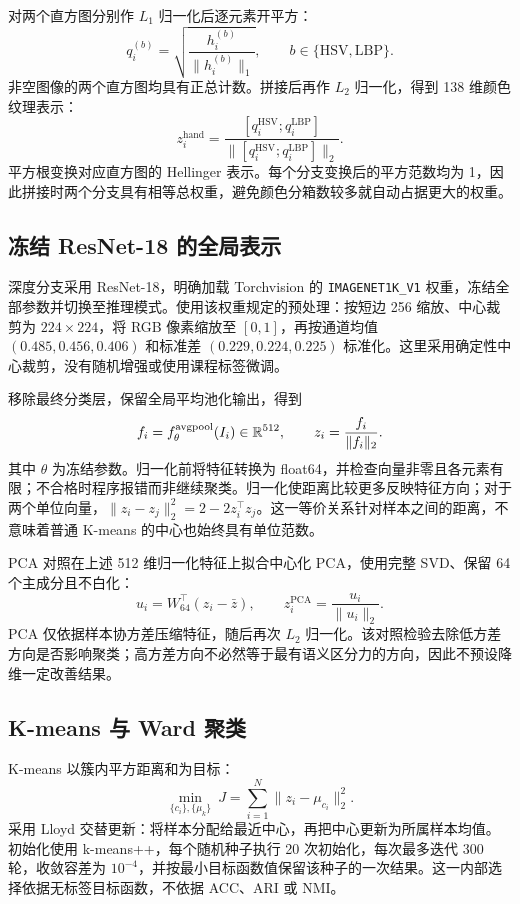 对两个直方图分别作 $L_1$ 归一化后逐元素开平方：
\begin{equation}
q_i^{(b)}=\sqrt{\frac{h_i^{(b)}}{\|h_i^{(b)}\|_1}},
\qquad b\in\{\mathrm{HSV},\mathrm{LBP}\}.
\end{equation}
非空图像的两个直方图均具有正总计数。拼接后再作 $L_2$ 归一化，得到 138 维颜色纹理表示：
\begin{equation}
z_i^{\mathrm{hand}}=
\frac{[q_i^{\mathrm{HSV}};q_i^{\mathrm{LBP}}]}
{\|[q_i^{\mathrm{HSV}};q_i^{\mathrm{LBP}}]\|_2}.
\end{equation}
平方根变换对应直方图的 Hellinger 表示。每个分支变换后的平方范数均为 1，因此拼接时两个分支具有相等总权重，避免颜色分箱数较多就自动占据更大的权重。

\subsection{冻结 ResNet-18 的全局表示}
深度分支采用 ResNet-18\citep{he2016resnet}，明确加载 Torchvision 的 \texttt{IMAGENET1K\_V1} 权重，冻结全部参数并切换至推理模式。使用该权重规定的预处理：按短边 256 缩放、中心裁剪为 $224\times224$，将 RGB 像素缩放至 $[0,1]$，再按通道均值 $(0.485,0.456,0.406)$ 和标准差 $(0.229,0.224,0.225)$ 标准化\citep{torchvisionresnet18}。这里采用确定性中心裁剪，没有随机增强或使用课程标签微调。

移除最终分类层，保留全局平均池化输出，得到
\begin{equation}
f_i=f_{\theta}^{\mathrm{avgpool}}(I_i)\in\mathbb{R}^{512},
\qquad
z_i=\frac{f_i}{\|f_i\|_2}.
\label{eq:deep-feature}
\end{equation}
其中 $\theta$ 为冻结参数。归一化前将特征转换为 float64，并检查向量非零且各元素有限；不合格时程序报错而非继续聚类。归一化使距离比较更多反映特征方向；对于两个单位向量，$\|z_i-z_j\|_2^2=2-2z_i^\top z_j$。这一等价关系针对样本之间的距离，不意味着普通 K-means 的中心也始终具有单位范数。

PCA 对照在上述 512 维归一化特征上拟合中心化 PCA，使用完整 SVD、保留 64 个主成分且不白化：
\begin{equation}
u_i=W_{64}^{\top}(z_i-\bar z),\qquad
z_i^{\mathrm{PCA}}=\frac{u_i}{\|u_i\|_2}.
\end{equation}
PCA 仅依据样本协方差压缩特征，随后再次 $L_2$ 归一化。该对照检验去除低方差方向是否影响聚类；高方差方向不必然等于最有语义区分力的方向，因此不预设降维一定改善结果。

\subsection{K-means 与 Ward 聚类}
K-means 以簇内平方距离和为目标：
\begin{equation}
\min_{\{c_i\},\{\mu_k\}}\ J
=\sum_{i=1}^{N}\|z_i-\mu_{c_i}\|_2^2.
\label{eq:kmeans}
\end{equation}
采用 Lloyd 交替更新\citep{lloyd1982}：将样本分配给最近中心，再把中心更新为所属样本均值。初始化使用 k-means++\citep{arthur2007}，每个随机种子执行 20 次初始化，每次最多迭代 300 轮，收敛容差为 $10^{-4}$，并按最小目标函数值保留该种子的一次结果。这一内部选择依据无标签目标函数，不依据 ACC、ARI 或 NMI。

